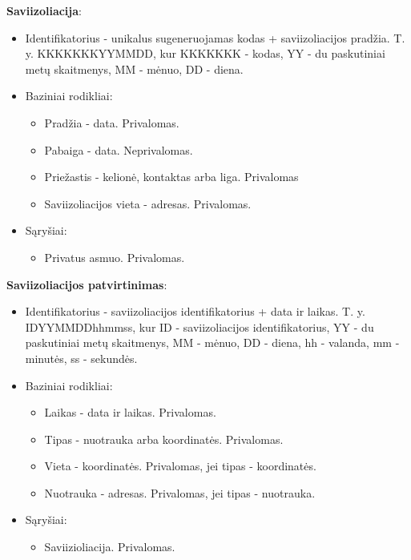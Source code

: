 \documentclass{VUMIFPSkursinis}
\begin{document}
\noindent\textbf{Saviizoliacija}:
\begin{itemize}
	\item Identifikatorius - unikalus sugeneruojamas kodas + saviizoliacijos pradžia. T. y. KKKKKKKYYMMDD, kur KKKKKKK - kodas, YY - du paskutiniai metų skaitmenys, MM - mėnuo, DD - diena.
	\item Baziniai rodikliai:
	\begin{itemize}
		\item Pradžia - data. Privalomas.
		\item Pabaiga - data. Neprivalomas.
		\item Priežastis - kelionė, kontaktas arba liga. Privalomas
		\item Saviizoliacijos vieta - adresas. Privalomas.
	\end{itemize}
	\item Sąryšiai:
	\begin{itemize}
		\item Privatus asmuo. Privalomas.
	\end{itemize}	
\end{itemize}

\noindent\textbf{Saviizoliacijos patvirtinimas}:
\begin{itemize}
	\item Identifikatorius - saviizoliacijos identifikatorius + data ir laikas. T. y. IDYYMMDDhhmmss, kur ID - saviizoliacijos identifikatorius, YY - du paskutiniai metų skaitmenys, MM - mėnuo, DD - diena, hh - valanda, mm - minutės, ss - sekundės.
	\item Baziniai rodikliai:
	\begin{itemize}
		\item Laikas - data ir laikas. Privalomas.
		\item Tipas - nuotrauka arba koordinatės. Privalomas.
		\item Vieta - koordinatės. Privalomas, jei tipas - koordinatės.
		\item Nuotrauka - adresas. Privalomas, jei tipas - nuotrauka.
	\end{itemize}
	\item Sąryšiai:
	\begin{itemize}
		\item Saviizioliacija. Privalomas.
	\end{itemize}	
\end{itemize}
\end{document}
